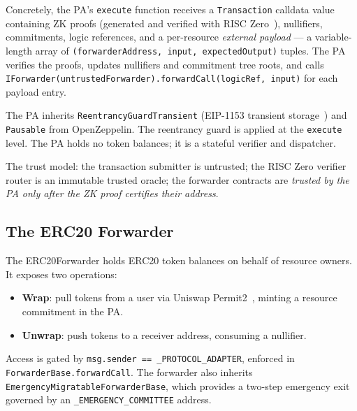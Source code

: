 \documentclass[11pt,a4paper]{article}
\begin{document}
Concretely, the PA's \texttt{execute} function receives a \texttt{Transaction}
calldata value containing ZK proofs (generated and verified with RISC
Zero~\cite{anomaspecs}), nullifiers, commitments, logic references, and a
per-resource \emph{external payload} --- a variable-length array of
\texttt{(forwarderAddress, input, expectedOutput)} tuples. The PA verifies the
proofs, updates nullifiers and commitment tree roots, and calls
\texttt{IForwarder(untrustedForwarder).forwardCall(logicRef, input)} for each
payload entry.

The PA inherits \texttt{ReentrancyGuardTransient} (EIP-1153 transient
storage~\cite{eip1153}) and \texttt{Pausable} from OpenZeppelin. The
reentrancy guard is applied at the \texttt{execute} level. The PA holds no
token balances; it is a stateful verifier and dispatcher.

The trust model: the transaction submitter is untrusted; the RISC Zero
verifier router is an immutable trusted oracle; the forwarder contracts are
\emph{trusted by the PA only after the ZK proof certifies their address}.

\subsection{The ERC20 Forwarder}

The \textsf{ERC20Forwarder} holds ERC20 token balances on behalf of resource
owners. It exposes two operations:
\begin{itemize}
  \item \textbf{Wrap}: pull tokens from a user via Uniswap
    Permit2~\cite{permit2}, minting a resource commitment in the PA.
  \item \textbf{Unwrap}: push tokens to a receiver address, consuming a
    nullifier.
\end{itemize}
Access is gated by
\texttt{msg.sender\,==\,\_PROTOCOL\_ADAPTER}, enforced in
\texttt{ForwarderBase.\allowbreak{}forwardCall}.  The forwarder also inherits
\texttt{Emergency\-Migratable\-Forwarder\-Base}, which provides a two-step
emergency exit governed by an \texttt{\_EMERGENCY\_COMMITTEE} address.
\end{document}
